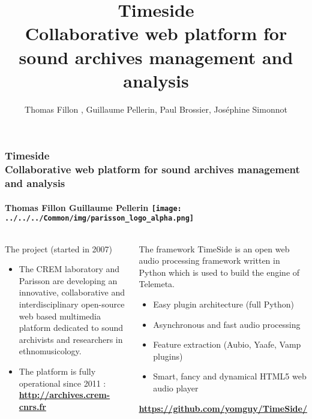 \documentclass[final, hyperref, table]{beamer} \mode<presentation>
\title[TELEMETA, audio web CMS for Ethnomusicological
archives]{Timeside\\Collaborative web platform for sound
archives management and analysis}
\author[Fillon, Pellerin, Brossier, Simonnot]{Thomas Fillon
  \inst{1,2}, Guillaume Pellerin\inst{1}, Paul Brossier\inst{1},
  Jos{\'e}phine Simonnot\inst{3}}
\begin{document}
\setlength{\leftmargini}{10pt} \thispagestyle{empty}
\begin{frame}\tiny
  \frametitle{\textbf{Timeside} \\ Collaborative web platform for sound
archives management and analysis %
    \hspace{.4\linewidth} 
}
  \framesubtitle{Thomas Fillon
  Guillaume Pellerin \texttt{[image: ../../../Common/img/parisson\_logo\_alpha.png]}}
  
  \vspace{-0.2cm}
  \begin{columns}

    \column[t]{5.3cm}

    \begin{block}{The project {\tiny(started in 2007)}}
      \begin{itemize}
      \item The CREM laboratory and Parisson are developing an
        innovative, collaborative and interdisciplinary
        \alert{open-source web based multimedia platform} dedicated to
        \alert{sound archivists} and \alert{researchers in
          ethnomusicology}.
      \item The platform is fully operational since 2011 :
        \colorbox{yellow!50} {\bf \url{http://archives.crem-cnrs.fr}}
      \end{itemize}
    \end{block}
    \vspace{-0.2cm}
    \begin{block}{The framework}
      TimeSide is an \alert{open web audio processing framework} written in
      Python which is used to build the engine of Telemeta.
      \begin{itemize}
      \item Easy plugin architecture (full \alert{Python})
      \item Asynchronous and fast audio processing
      \item \alert{Feature extraction} (Aubio, Yaafe, Vamp plugins)
      \item Smart, fancy and dynamical \alert{HTML5 web audio player}
      \end{itemize}
      \vspace{-0.5cm}
      \begin{center}
        \colorbox{yellow!50}{\bf
          \url{https://github.com/yomguy/TimeSide/}}
      \end{center}


\end{block}
\end{columns}
\end{frame}
\end{document}

